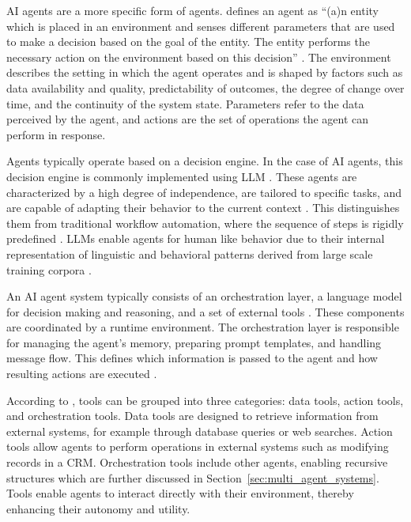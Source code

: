 \documentclass[a4paper,oneside,bibliography=totoc]{scrbook}
\begin{document}
\ac{AI} agents are a more specific form of agents. \citet{Dorri2018} defines an agent as \enquote{(a)n entity which is placed in an environment and senses different parameters that are used to make a decision based on the goal of the entity. The entity performs the necessary action on the environment based on this decision} \cite[S. 28574]{Dorri2018}. The environment describes the setting in which the agent operates and is shaped by factors such as data availability and quality, predictability of outcomes, the degree of change over time, and the continuity of the system state. Parameters refer to the data perceived by the agent, and actions are the set of operations the agent can perform in response.

Agents typically operate based on a decision engine. In the case of \ac{AI} agents, this decision engine is commonly implemented using \ac{LLM} \cite{Sapkota2025,Park2023}. These agents are characterized by a high degree of independence, are tailored to specific tasks, and are capable of adapting their behavior to the current context \cite{Sapkota2025,OpenAI2025}. This distinguishes them from traditional workflow automation, where the sequence of steps is rigidly predefined \cite{Anthropic2024}. \acp{LLM} enable agents for human like behavior due to their internal representation of linguistic and behavioral patterns derived from large scale training corpora \cite{Park2023}.

An \ac{AI} agent system typically consists of an orchestration layer, a language model for decision making and reasoning, and a set of external tools \cite{Wiesinger2025,OpenAI2025}. These components are coordinated by a runtime environment. The orchestration layer is responsible for managing the agent's memory, preparing prompt templates, and handling message flow. This defines which information is passed to the agent and how resulting actions are executed \cite{Wiesinger2025}.

According to \citet{OpenAI2025}, tools can be grouped into three categories: data tools, action tools, and orchestration tools. Data tools are designed to retrieve information from external systems, for example through database queries or web searches. Action tools allow agents to perform operations in external systems such as modifying records in a \ac{CRM}. Orchestration tools include other agents, enabling recursive structures which are further discussed in Section~\ref{sec:multi_agent_systems}. Tools enable agents to interact directly with their environment, thereby enhancing their autonomy and utility.
\end{document}
